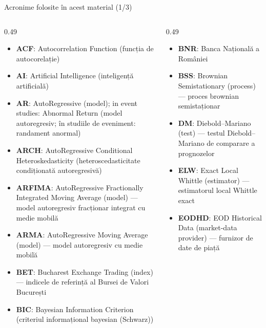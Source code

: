 {
\begin{frame}[noframenumbering]
    \titlepage
\end{frame}
}
\begin{frame}{Acronime folosite în acest material (1/3)}
\begin{columns}[T]
\begin{column}{0.49\textwidth}
\begin{itemize}\setlength{\itemsep}{0pt}
    \item \textbf{ACF}: Autocorrelation Function (funcția de autocorelație)
    \item \textbf{AI}: Artificial Intelligence (inteligență artificială)
    \item \textbf{AR}: AutoRegressive (model); in event studies: Abnormal Return (model autoregresiv; în studiile de eveniment: randament anormal)
    \item \textbf{ARCH}: AutoRegressive Conditional Heteroskedasticity (heteroscedasticitate condiționată autoregresivă)
    \item \textbf{ARFIMA}: AutoRegressive Fractionally Integrated Moving Average (model) — model autoregresiv fracționar integrat cu medie mobilă
    \item \textbf{ARMA}: AutoRegressive Moving Average (model) — model autoregresiv cu medie mobilă
    \item \textbf{BET}: Bucharest Exchange Trading (index) — indicele de referință al Bursei de Valori București
    \item \textbf{BIC}: Bayesian Information Criterion (criteriul informațional bayesian (Schwarz))
\end{itemize}
\end{column}
\begin{column}{0.49\textwidth}
\begin{itemize}\setlength{\itemsep}{0pt}
    \item \textbf{BNR}: Banca Națională a României
    \item \textbf{BSS}: Brownian Semistationary (process) — proces brownian semistaționar
    \item \textbf{DM}: Diebold–Mariano (test) — testul Diebold–Mariano de comparare a prognozelor
    \item \textbf{ELW}: Exact Local Whittle (estimator) — estimatorul local Whittle exact
    \item \textbf{EODHD}: EOD Historical Data (market-data provider) — furnizor de date de piață

\end{itemize}
\end{column}
\end{columns}
\end{frame}
